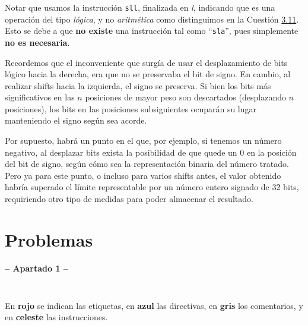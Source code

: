 \documentclass[a4paper]{report}
\begin{document}
Notar que usamos la instrucción \texttt{sll}, finalizada en \textit{l}, indicando que es una operación del tipo \textit{lógica}, y no \textit{aritmética} como distinguimos en la Cuestión \hyperref[sec:c3-11]{3.11}. Esto se debe a que \textbf{no existe} una instrucción tal como ``\texttt{sla}'', pues simplemente \textbf{no es necesaria}.

Recordemos que el inconveniente que surgía de usar el desplazamiento de bits lógico hacia la derecha, era que no se preservaba el bit de signo. En cambio, al realizar shifts hacia la izquierda, el signo se preserva. Si bien los bits más significativos en las $n$ posiciones de mayor peso son descartados (desplazando $n$ posiciones), los bits en las posiciones subsiguientes ocuparán su lugar manteniendo el signo según sea acorde.

Por supuesto, habrá un punto en el que, por ejemplo, si tenemos un número negativo, al desplazar bits exista la posibilidad de que quede un 0 en la posición del bit de signo, según cómo sea la representación binaria del número tratado. Pero ya para este punto, o incluso para varios shifts antes, el valor obtenido habría superado el límite representable por un número entero signado de 32 bits, requiriendo otro tipo de medidas para poder almacenar el resultado.

\chapter{Problemas}

\begin{center}
    \Large\textbf{-- Apartado 1 --}
\end{center}

\section{}

\inputminted[linenos]{mips}{src/problemas/1.asm}

En \textcolor{autumn-red-pyg}{\textbf{rojo}} se indican las etiquetas, en \textcolor{autumn-blue-pyg}{\textbf{azul}} las directivas, en \textcolor{autumn-gray-pyg}{\textbf{gris}} los comentarios, y en \textcolor{autumn-teal-pyg}{\textbf{celeste}} las instrucciones.

\section{}
\end{document}
